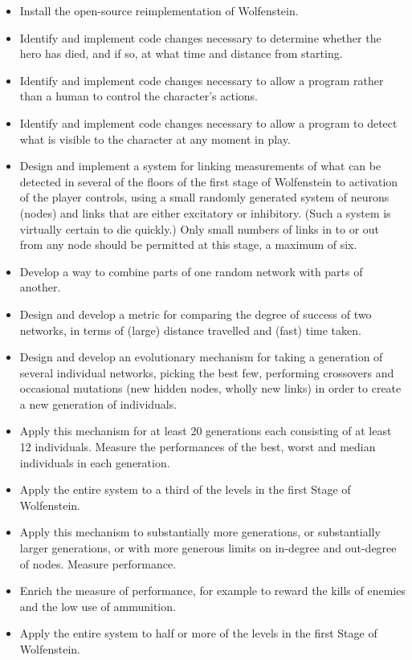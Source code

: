 \documentclass[]{Learning-to-Play-Wolfenstein-thesis}
\begin{document}
\begin{itemize}
\item Install the open-source reimplementation of Wolfenstein.
\item Identify and implement code changes necessary to determine whether the hero has died, and if so, at what time and distance from starting.
\item Identify and implement code changes necessary to allow a program rather than a human to control the character's actions.
\item Identify and implement code changes necessary to allow a program to detect what is visible to the character at any moment in play.
\item Design and implement a system for linking measurements of what can be detected in several of the floors of the first stage of Wolfenstein to activation of the player controls, using a small randomly generated system of neurons (nodes) and links that are either excitatory or inhibitory. (Such a system is virtually certain to die quickly.) Only small numbers of links in to or out from any node should be permitted at this stage, a maximum of six.
\item Develop a way to combine parts of one random network with parts of another.
\end{itemize}
\newpage
{}
\begin{itemize}
\item Design and develop a metric for comparing the degree of success of two networks, in terms of (large) distance travelled and (fast) time taken.
\item Design and develop an evolutionary mechanism for taking a generation of several individual networks, picking the best few, performing crossovers and occasional mutations (new hidden nodes, wholly new links) in order to create a new generation of individuals.
\item Apply this mechanism for at least 20 generations each consisting of at least 12 individuals. Measure the performances of the best, worst and median individuals in each generation.
\item Apply the entire system to a third of the levels in the first Stage of Wolfenstein.
\end{itemize}

\begin{itemize}
\item Apply this mechanism to substantially more generations, or substantially larger generations, or with more generous limits on in-degree and out-degree of nodes. Measure performance.
\item Enrich the measure of performance, for example to reward the kills of enemies and the low use of ammunition.
\item Apply the entire system to half or more of the levels in the first Stage of Wolfenstein.
\end{itemize}
\end{document}
